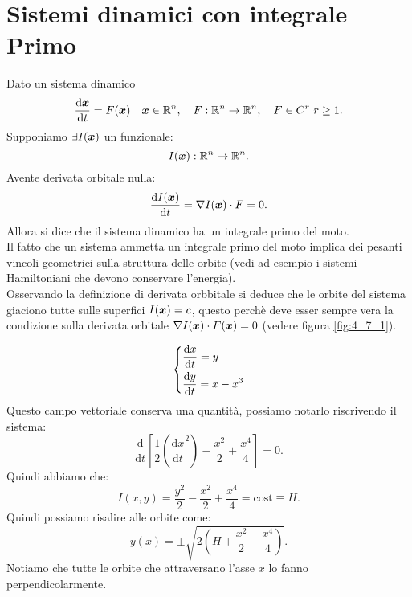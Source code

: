 \section{Sistemi dinamici con integrale Primo}%
\label{sub:Sistemi dinamici con integrale Primo}
Dato un sistema dinamico 
\[
    \frac{\text{d} \boldsymbol{x}}{\text{d} t} = F(\boldsymbol{x}) \quad  \boldsymbol{x}\in \mathbb{R}^n, \quad F:\mathbb{R}^n\to \mathbb{R}^n, \quad  F \in C^r \ r \ge 1
.\] 
Supponiamo $\exists I (\boldsymbol{x}) $  un funzionale:
\[
    I(\boldsymbol{x}): \mathbb{R}^n\to \mathbb{R}^n
.\] 
Avente derivata orbitale nulla:
\[
    \frac{\text{d} I(\boldsymbol{x}) }{\text{d} t} =  \nabla I(\boldsymbol{x}) \cdot F = 0
.\] 
Allora si dice che il sistema dinamico ha un integrale primo del moto.\\
Il fatto che un sistema ammetta un integrale primo del moto implica dei pesanti vincoli geometrici sulla struttura delle orbite (vedi ad esempio i sistemi Hamiltoniani che devono conservare l'energia).\\
Osservando la definizione di derivata orbbitale si deduce che le orbite del sistema giaciono tutte sulle superfici $I(\boldsymbol{x}) = c$, questo perchè deve esser sempre vera la condizione sulla derivata orbitale $\nabla I(\boldsymbol{x}) \cdot F(\boldsymbol{x}) = 0$ (vedere figura \ref{fig:4_7_1}).
\begin{exmp}[]
    \[
    \begin{dcases}
    \frac{\text{d} x}{\text{d} t} = y\\
    \frac{\text{d} y}{\text{d} t} = x-x^3
    \end{dcases}
    \]
    Questo campo vettoriale conserva una quantità, possiamo notarlo riscrivendo il sistema:
    \[
        \frac{\text{d} }{\text{d} t} \left[\frac{1}{2}\left(\frac{\text{d} x}{\text{d} t} ^2\right)- \frac{x^2}{2}+\frac{x^4}{4}\right]= 0
    .\] 
    Quindi abbiamo che:
    \[
	I(x, y) = \frac{y^2}{2}-\frac{x^2}{2}+\frac{x^4}{4}= \text{cost}\equiv H
    .\] 
    Quindi possiamo risalire alle orbite come:
    \[
	y(x) = \pm \sqrt{2(H + \frac{x^2}{2}-\frac{x^4}{4}) } 
    .\] 
    Notiamo che tutte le orbite che attraversano l'asse $x$ lo fanno perpendicolarmente.
\end{exmp}
\noindent
